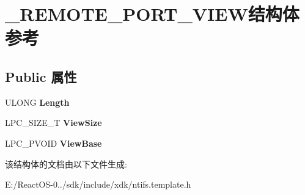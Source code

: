 \hypertarget{struct___r_e_m_o_t_e___p_o_r_t___v_i_e_w}{}\section{\+\_\+\+R\+E\+M\+O\+T\+E\+\_\+\+P\+O\+R\+T\+\_\+\+V\+I\+E\+W结构体 参考}
\label{struct___r_e_m_o_t_e___p_o_r_t___v_i_e_w}
\subsection*{Public 属性}
\begin{DoxyCompactItemize}
\item 
\mbox{\label{struct___r_e_m_o_t_e___p_o_r_t___v_i_e_w_ab96784b779c4ea71582e629dc55e3aed}} 
U\+L\+O\+NG {\bfseries Length}
\item 
\mbox{\label{struct___r_e_m_o_t_e___p_o_r_t___v_i_e_w_a3280f5288ef67827d6e69f2f54136a4d}} 
L\+P\+C\+\_\+\+S\+I\+Z\+E\+\_\+T {\bfseries View\+Size}
\item 
\mbox{\label{struct___r_e_m_o_t_e___p_o_r_t___v_i_e_w_a36e0a10c1b21075250253c727e88b35b}} 
L\+P\+C\+\_\+\+P\+V\+O\+ID {\bfseries View\+Base}
\end{DoxyCompactItemize}


该结构体的文档由以下文件生成\+:\begin{DoxyCompactItemize}
\item 
E\+:/\+React\+O\+S-\/0../sdk/include/xdk/ntifs.\+template.\+h\end{DoxyCompactItemize}
